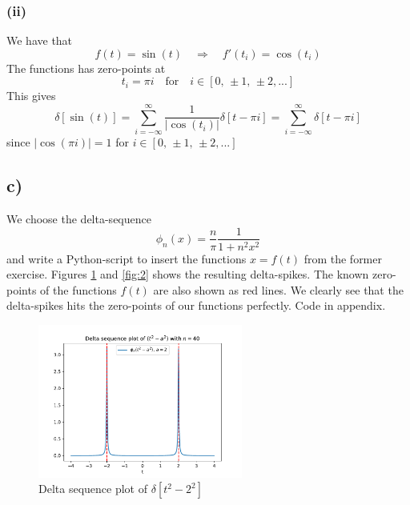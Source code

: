 \documentclass[10pt,a4paper]{article}
\begin{document}
\subsubsection*{(ii)}
We have that
\begin{equation}
    f(t) = \sin(t) \quad\Rightarrow\quad f'(t_i) = \cos(t_i)
\end{equation}
The functions has zero-points at
\begin{equation}
    t_i = \pi i \quad \text{for} \quad i \in [0,\, \pm 1,\, \pm 2, ...]
\end{equation}
This gives
\begin{equation}\label{eqn:3b2}
    \delta[\sin(t)] = \sum_{i=-\infty}^{\infty} \frac{1}{|\cos(t_i)|} \delta[t-\pi i] = \sum_{i=-\infty}^{\infty} \delta[t-\pi i]
\end{equation}
since $|\cos(\pi i)| = 1$ for $i\in [0,\, \pm 1,\, \pm 2, ...]$




\subsection*{c)}
We choose the delta-sequence
\begin{equation}
    \phi_n(x) = \frac{n}{\pi}\frac{1}{1+n^2x^2}
\end{equation}
and write a Python-script to insert the functions $x = f(t)$ from the former exercise. Figures \ref{fig:1} and \ref{fig:2} shows the resulting delta-spikes. The known zero-points of the functions $f(t)$ are also shown as red lines. We clearly see that the delta-spikes hits the zero-points of our functions perfectly. Code in appendix.

\begin{figure}[H]
    \centering
    \includegraphics[width=0.6\textwidth]{delta_seq_a.pdf}
    \caption{Delta sequence plot of $\delta[t^2-2^2]$}
    \label{fig:1}
\end{figure}
\end{document}
